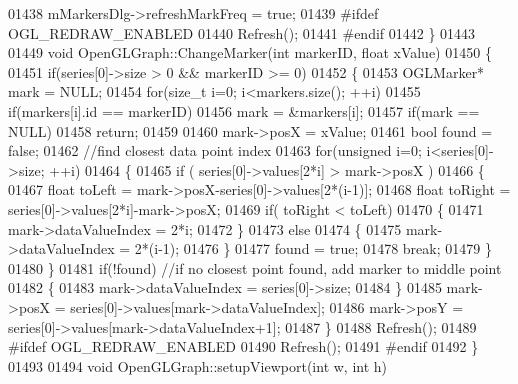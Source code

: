 \begin{DoxyCode}
{{{{{{{{{{{{{{{{01438     mMarkersDlg->refreshMarkFreq = \textcolor{keyword}{true};
01439 \textcolor{preprocessor}{    #ifdef OGL\_REDRAW\_ENABLED}
01440         Refresh();
01441 \textcolor{preprocessor}{    #endif}
01442 \}
01443 
01449 \textcolor{keywordtype}{void} OpenGLGraph::ChangeMarker(\textcolor{keywordtype}{int} markerID, \textcolor{keywordtype}{float} xValue)
01450 \{
01451     \textcolor{keywordflow}{if}(series[0]->size > 0 && markerID >= 0)
01452     \{
01453         OGLMarker* mark = NULL;
01454         \textcolor{keywordflow}{for}(\textcolor{keywordtype}{size\_t} i=0; i<markers.size(); ++i)
01455             \textcolor{keywordflow}{if}(markers[i].\textcolor{keywordtype}{id} == markerID)
01456                 mark = &markers[i];
01457         \textcolor{keywordflow}{if}(mark == NULL)
01458             \textcolor{keywordflow}{return};
01459 
01460         mark->posX = xValue;
01461         \textcolor{keywordtype}{bool} found = \textcolor{keyword}{false};
01462         \textcolor{comment}{//find closest data point index}
01463         \textcolor{keywordflow}{for}(\textcolor{keywordtype}{unsigned} i=0; i<series[0]->size; ++i)
01464         \{
01465             \textcolor{keywordflow}{if} ( series[0]->values[2*i] > mark->posX )
01466             \{
01467                 \textcolor{keywordtype}{float} toLeft = mark->posX-series[0]->values[2*(i-1)];
01468                 \textcolor{keywordtype}{float} toRight = series[0]->values[2*i]-mark->posX;
01469                 \textcolor{keywordflow}{if}( toRight < toLeft)
01470                 \{
01471                     mark->dataValueIndex = 2*i;
01472                 \}
01473                 \textcolor{keywordflow}{else}
01474                 \{
01475                     mark->dataValueIndex = 2*(i-1);
01476                 \}
01477                 found = \textcolor{keyword}{true};
01478                 \textcolor{keywordflow}{break};
01479             \}
01480         \}
01481         \textcolor{keywordflow}{if}(!found) \textcolor{comment}{//if no closest point found, add marker to middle point}
01482         \{
01483             mark->dataValueIndex = series[0]->size;
01484         \}
01485         mark->posX = series[0]->values[mark->dataValueIndex];
01486         mark->posY = series[0]->values[mark->dataValueIndex+1];
01487     \}
01488     Refresh();
01489 \textcolor{preprocessor}{    #ifdef OGL\_REDRAW\_ENABLED}
01490         Refresh();
01491 \textcolor{preprocessor}{    #endif}
01492 \}
01493 
01494 \textcolor{keywordtype}{void} OpenGLGraph::setupViewport(\textcolor{keywordtype}{int} w, \textcolor{keywordtype}{int} h)
}}}}}}}}}}}}}}}}
\end{DoxyCode}
